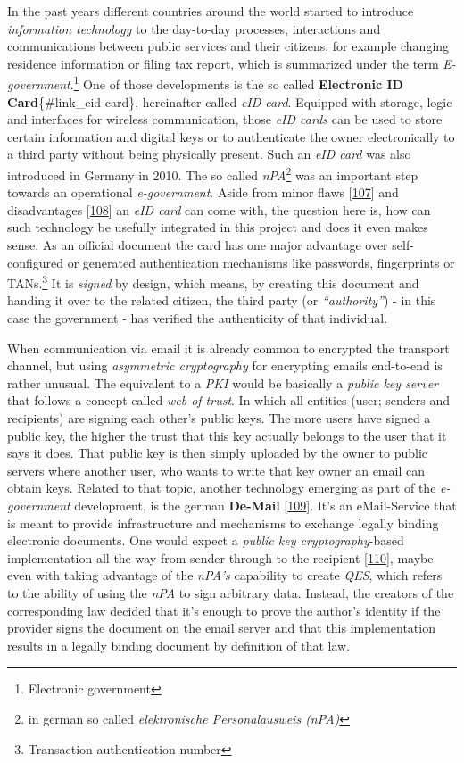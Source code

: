 \documentclass[12pt,english,a4paper,titlepage,cleardoublepage=empty,dottedtoc]{report}
\begin{document}
In the past years different countries around the world started to
introduce \emph{information technology} to the day-to-day processes,
interactions and communications between public services and their
citizens, for example changing residence information or filing tax
report, which is summarized under the term
\emph{E-government}.\footnote{Electronic government} One of those
developments is the so called \textbf{Electronic ID
Card}\{\#link\_eid-card\}, hereinafter called \emph{eID card}. Equipped
with storage, logic and interfaces for wireless communication, those
\emph{eID cards} can be used to store certain information and digital
keys or to authenticate the owner electronically to a third party
without being physically present. Such an \emph{eID card} was also
introduced in Germany in 2010. The so called \emph{nPA}\footnote{in
  german so called \emph{elektronische Personalausweis (nPA)}} was an
important step towards an operational \emph{e-government}. Aside from
minor flaws
{[}\protect\hyperlink{ref-web_2013_npa-sicherheitsdefizit}{107}{]} and
disadvantages
{[}\protect\hyperlink{ref-web_2014_test-qes-support-in-npa}{108}{]} an
\emph{eID card} can come with, the question here is, how can such
technology be usefully integrated in this project and does it even makes
sense. As an official document the card has one major advantage over
self-configured or generated authentication mechanisms like passwords,
fingerprints or TANs.\footnote{Transaction authentication number} It is
\emph{signed} by design, which means, by creating this document and
handing it over to the related citizen, the third party (or
\emph{``authority''}) - in this case the government - has verified the
authenticity of that individual.

When communication via email it is already common to encrypted the
transport channel, but using \emph{asymmetric cryptography} for
encrypting emails end-to-end is rather unusual. The equivalent to a
\emph{PKI} would be basically a \emph{public key server} that follows a
concept called \emph{web of trust}. In which all entities (user; senders
and recipients) are signing each other's public keys. The more users
have signed a public key, the higher the trust that this key actually
belongs to the user that it says it does. That public key is then simply
uploaded by the owner to public servers where another user, who wants to
write that key owner an email can obtain keys. Related to that topic,
another technology emerging as part of the \emph{e-government}
development, is the german \textbf{De-Mail}
{[}\protect\hyperlink{ref-web_2017_about-de-mail}{109}{]}. It's an
eMail-Service that is meant to provide infrastructure and mechanisms to
exchange legally binding electronic documents. One would expect a
\emph{public key cryptography}-based implementation all the way from
sender through to the recipient
{[}\protect\hyperlink{ref-statement_2013_de-mail}{110}{]}, maybe even
with taking advantage of the \emph{nPA's} capability to create
\emph{QES}, which refers to the ability of using the \emph{nPA} to sign
arbitrary data. Instead, the creators of the corresponding law decided
that it's enough to prove the author's identity if the provider signs
the document on the email server and that this implementation results in
a legally binding document by definition of that law.
\end{document}
